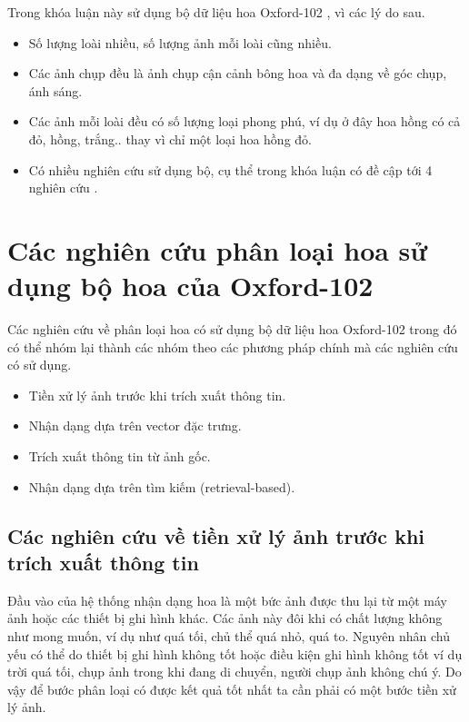 \documentclass[12pt]{report}
\begin{document}
		Trong khóa luận này sử dụng bộ dữ liệu hoa Oxford-102 \cite{cia-Nilsback06}, vì các lý do sau.
																																																				
		\begin{itemize}
			\item Số lượng loài nhiều, số lượng ảnh mỗi loài cũng nhiều.
			\item Các ảnh chụp đều là ảnh chụp cận cảnh bông hoa và đa dạng về góc chụp, ánh sáng.
			\item Các ảnh mỗi loài đều có số lượng loại phong phú, ví dụ ở đây hoa hồng có cả đỏ, hồng, trắng.. thay vì chỉ một loại hoa hồng đỏ.
			\item Có nhiều nghiên cứu sử dụng bộ, cụ thể trong khóa luận có đề cập tới 4 nghiên cứu \cite{cia-Nilsback06} \cite{cia-Nilsback08} \cite{cia-ONE} \cite{cia-CNNFeatures off-the-shelf}.
		\end{itemize}				
																																																								
																																																						
		\section{Các nghiên cứu phân loại hoa sử dụng bộ hoa của Oxford-102}
		Các nghiên cứu về phân loại hoa \cite{cia-Nilsback06} \cite{cia-Nilsback08} \cite{cia-ONE} \cite{cia-CNNFeatures off-the-shelf} có sử dụng bộ dữ liệu hoa Oxford-102 \cite{cia-Nilsback06} trong đó có thể nhóm lại thành các nhóm theo các phương pháp chính mà các nghiên cứu có sử dụng.
																																																		
		\begin{itemize}
			\item Tiền xử lý ảnh trước khi trích xuất thông tin.
			\item Nhận dạng dựa trên vector đặc trưng.
			\item Trích xuất thông tin từ ảnh gốc.
			\item Nhận dạng dựa trên tìm kiếm (retrieval-based).
		\end{itemize}
																																																		
		\subsection{Các nghiên cứu về tiền xử lý ảnh trước khi trích xuất thông tin}
		Đầu vào của hệ thống nhận dạng hoa là một bức ảnh được thu lại từ một máy ảnh hoặc các thiết bị ghi hình khác. Các ảnh này đôi khi có chất lượng không như mong muốn, ví dụ như quá tối, chủ thể quá nhỏ, quá to. Nguyên nhân chủ yếu có thể do thiết bị ghi hình không tốt hoặc điều kiện ghi hình không tốt ví dụ trời quá tối, chụp ảnh trong khi đang di chuyển, người chụp ảnh không chú ý. Do vậy để bước phân loại có được kết quả tốt nhất ta cần phải có một bước tiền xử lý ảnh. 
																																																
\end{document}
